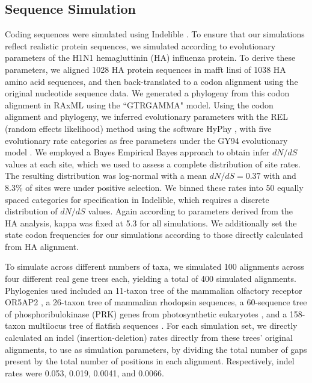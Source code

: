 \documentclass[10pt]{article}
\begin{document}
\subsection*{Sequence Simulation}
Coding sequences were simulated using Indelible \citep{Fletcher2009}. To ensure that our simulations reflect realistic protein sequences, we simulated according to evolutionary parameters of the H1N1 hemagluttinin (HA) influenza protein. To derive these parameters, we aligned 1028 HA protein sequences in mafft linsi \citep{Katoh2005} of 1038 HA amino acid sequences, and then back-translated to a codon alignment using the original nucleotide sequence data. We generated a phylogeny from this codon alignment in RAxML \citep{Stamatakis2006} using the ``GTRGAMMA" model. Using the codon alignment and phylogeny, we inferred evolutionary parameters with the REL (random effects likelihood)  method \citep{NielsenYang1998} using the software HyPhy \citep{Pond2005}, with five evolutionary rate categories as free parameters under the GY94 evolutionary model \citep{GoldmanYang1994}. We employed a Bayes Empirical Bayes approach \citep{Yang2000} to obtain infer $dN/dS$ values at each site, which we used to assess a complete distribution of site rates. The resulting distribution was log-normal with a mean $dN/dS = 0.37$ with and 8.3\% of sites were under positive selection. We binned these rates into 50 equally spaced categories for specification in Indelible, which requires a discrete distribution of $dN/dS$ values. Again according to parameters derived from the HA analysis, kappa was fixed at 5.3 for all simulations. We additionally set the state codon frequencies for our simulations according to those directly calculated from HA alignment. 

To simulate across different numbers of taxa, we simulated 100 alignments across four different real gene trees each, yielding a total of 400 simulated alignments. Phylogenies used included an 11-taxon tree of the mammalian olfactory receptor OR5AP2 \citep{Spielman2013}, a 26-taxon tree of mammalian rhodopsin sequences\citep{Spielman2013}, a 60-sequence tree of phosphoribulokinase (PRK) genes from photosynthetic eukaryotes \citep{Yang2011}, and a 158-taxon multilocus tree of flatfish sequences \citep{Betancur2013}.
For each simulation set, we directly calculated an indel (insertion-deletion) rates directly from these trees’ original alignments, to use as simulation parameters, by dividing the total number of gaps present by the total number of positions in each alignment. Respectively, indel rates were 0.053, 0.019, 0.0041, and 0.0066. 
\end{document}
